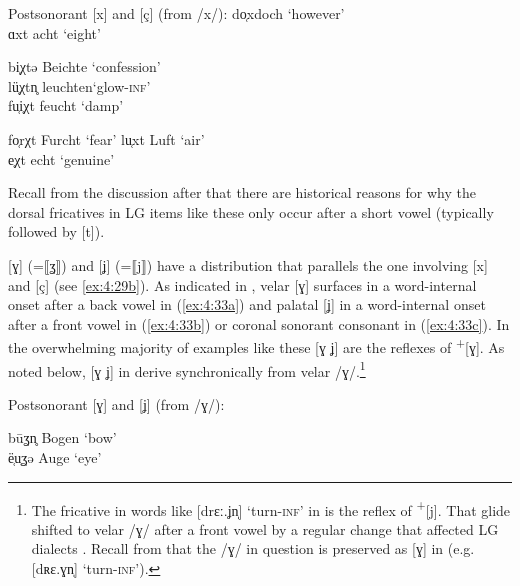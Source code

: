 
\ea%
      Postsonorant [x] and [ç] (from /x/):\label{ex:4:32}
\ea\label{ex:4:32a} do̜x\tab  [dɔx]\tab   doch \tab  ‘however’ \\
    ɑxt \tab [ɑxt] \tab  acht  \tab ‘eight’    

\ex\label{ex:4:32b} bi̜χtə  \tab [bɪçtə]  \tab Beichte   \tab ‘confession’          \\
    lü̜χtn̥ \tab  [lʏçtn̩]\tab   leuchten\tab   ‘glow-\textsc{inf}’ \\
    fu̜i̜χt \tab  [fʊɪçt] \tab  feucht   \tab  ‘damp’               

\ex\label{ex:4:32c} fo̜rχt \tab [fɔrçt] \tab  Furcht \tab ‘fear’    
\ex\label{ex:4:32d} lu̜xt  \tab [lʊxt]  \tab  Luft   \tab ‘air’     \\
    e̜χt   \tab [ɛçt]   \tab  echt   \tab ‘genuine’ 
   \z
\z 

Recall from the discussion after  that there are historical reasons for why the dorsal fricatives in LG items like these only occur after a short vowel (typically followed by [t]).

[ɣ] (=⟦ʓ⟧) and [ʝ] (=⟦j⟧) have a distribution that parallels the one involving [x] and [ç] (see \ref{ex:4:29b}). As indicated in , velar [ɣ] surfaces in a word-internal onset after a back vowel in (\ref{ex:4:33a}) and palatal [ʝ] in a word-internal onset after a front vowel in (\ref{ex:4:33b}) or coronal sonorant consonant in (\ref{ex:4:33c}). In the overwhelming majority of examples like these [ɣ ʝ] are the reflexes of  \textsuperscript{+}[ɣ]. As noted below, [ɣ ʝ] in  derive synchronically from velar /ɣ/.\footnote{{The fricative in words like [drɛː.ʝn̩] ‘turn-}\textrm{\textsc{inf}}\textrm{’ in  is the reflex of } \textrm{\textsuperscript{+}}\textrm{[j]. That glide shifted to velar /ɣ/ after a front vowel by a regular change that affected LG dialects \citep{Hall2014a}. Recall from  that the /ɣ/ in question is preserved as [ɣ] in  (e.g. [dʀɛ.ɣn̩] ‘turn-}\textrm{\textsc{inf}}\textrm{’).} }

\ea%
\label{ex:4:33}
   Postsonorant [ɣ] and [ʝ] (from /ɣ/):

\ea\label{ex:4:33a} būʓn̥  \tab [buː.ɣn̩] \tab Bogen \tab  ‘bow’ \\
    ë̜u̜ʓə \tab  [ɛʊ.ɣə]  \tab Auge  \tab ‘eye’  

